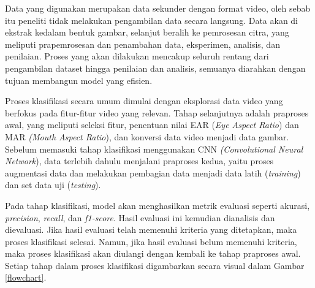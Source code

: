 


    Data yang digunakan merupakan data sekunder dengan format video, oleh sebab itu peneliti tidak melakukan pengambilan data secara langsung. Data akan di ekstrak kedalam bentuk gambar, selanjut beralih ke pemrosesan citra, yang meliputi prapemrosesan dan penambahan data, eksperimen, analisis, dan penilaian. Proses yang akan dilakukan mencakup seluruh rentang dari  pengambilan dataset hingga penilaian dan analisis, semuanya diarahkan dengan tujuan membangun model yang efisien. 
    
    Proses klasifikasi secara umum dimulai dengan eksplorasi data video yang berfokus pada fitur-fitur video yang relevan. Tahap selanjutnya adalah praproses awal, yang meliputi seleksi fitur, penentuan nilai EAR (\textit{Eye Aspect Ratio}) dan MAR \textit{(Mouth Aspect Ratio}), dan konversi data video menjadi data gambar. Sebelum memasuki tahap klasifikasi menggunakan CNN \textit{(Convolutional Neural Network}), data terlebih dahulu menjalani praproses kedua, yaitu proses augmentasi data dan melakukan pembagian data menjadi data latih (\textit{training}) dan set data uji (\textit{testing}).

    Pada tahap klasifikasi, model akan menghasilkan metrik evaluasi seperti akurasi,\textit{ precision}, \textit{recall}, dan \textit{f1-score}. Hasil evaluasi ini kemudian dianalisis dan dievaluasi. Jika hasil evaluasi telah memenuhi kriteria yang ditetapkan, maka proses klasifikasi selesai. Namun, jika hasil evaluasi belum memenuhi kriteria, maka proses klasifikasi akan diulangi dengan kembali ke tahap praproses awal. Setiap tahap dalam proses klasifikasi digambarkan secara visual dalam Gambar \ref{flowchart}.



